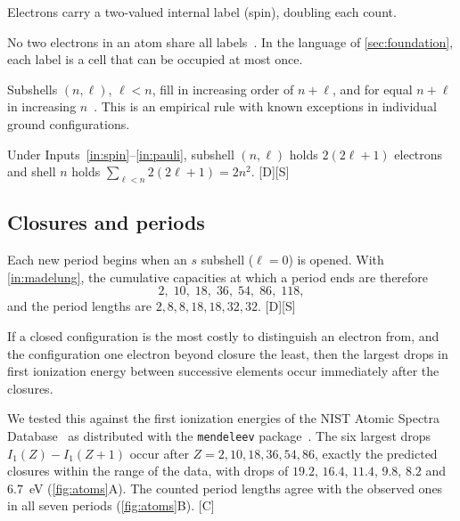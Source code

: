 \documentclass[10pt,twocolumn,a4paper]{article}
\newcommand{\D}{\textsf{[D]}}
\newcommand{\Sup}{\textsf{[S]}}
\newcommand{\C}{\textsf{[C]}}
\begin{document}
\begin{inputstmt}
\label{in:spin}
Electrons carry a two-valued internal label (spin), doubling each count.
\end{inputstmt}

\begin{inputstmt}[Exclusion]
\label{in:pauli}
No two electrons in an atom share all labels~\citep{pauli1925}. In the
language of \cref{sec:foundation}, each label is a cell that can be occupied
at most once.
\end{inputstmt}

\begin{inputstmt}
\label{in:madelung}
Subshells $(n,\ell)$, $\ell<n$, fill in increasing order of $n+\ell$, and for
equal $n+\ell$ in increasing $n$~\citep{madelung1936}. This is an empirical
rule with known exceptions in individual ground configurations.
\end{inputstmt}

Under Inputs~\ref{in:spin}--\ref{in:pauli}, subshell $(n,\ell)$ holds
$2(2\ell+1)$ electrons and shell $n$ holds $\sum_{\ell<n}2(2\ell+1)=2n^2$.
\D\Sup

\subsection{Closures and periods}

Each new period begins when an $s$ subshell ($\ell=0$) is opened. With
\cref{in:madelung}, the cumulative capacities at which a period ends are
therefore
\begin{equation}
2,\;10,\;18,\;36,\;54,\;86,\;118,
\end{equation}
and the period lengths are $2,8,8,18,18,32,32$. \D\Sup

\begin{prediction}
\label{pred:closures}
If a closed configuration is the most costly to distinguish an electron from,
and the configuration one electron beyond closure the least, then the largest
drops in first ionization energy between successive elements occur
immediately after the closures.
\end{prediction}

We tested this against the first ionization energies of the NIST Atomic
Spectra Database~\citep{kramida2023} as distributed with the
\texttt{mendeleev} package~\citep{mentel2014}. The six largest drops
$I_1(Z)-I_1(Z+1)$ occur after $Z=2,10,18,36,54,86$, exactly the predicted
closures within the range of the data, with drops of $19.2$, $16.4$, $11.4$,
$9.8$, $8.2$ and $6.7$~eV (\cref{fig:atoms}A). The counted period lengths
agree with the observed ones in all seven periods (\cref{fig:atoms}B). \C
\end{document}
